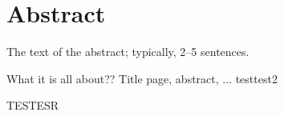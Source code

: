 \chapter*{Abstract}                   %
The text of the abstract;
typically, 2--5 sentences.

What it is all about??
Title page, abstract, ...
testtest2
\par
TESTESR